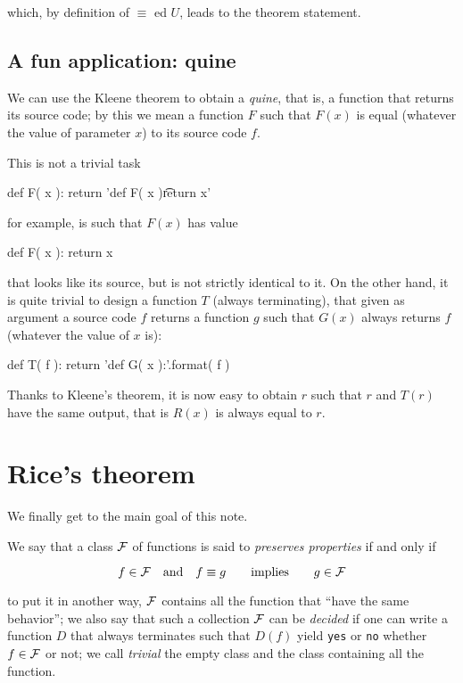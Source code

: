 \documentclass[a4paper]{article}
\begin{document}
which, by definition of $\equiv$ ed $U$, leads to the theorem statement.

\subsection*{A fun application: quine}

We can use the Kleene theorem to obtain a \emph{quine}, that is, a function
that returns its source code; by this we mean a function $F$ such that $F(x)$
is equal (whatever the value of parameter $x$) to its source code $f$.

This is not a trivial task

\begin{pycode}
def F( x ):
  return 'def F( x )\n\t return x'
\end{pycode}

for example, is such that $F(x)$ has value

\begin{pycode}
def F( x ):
  return x
\end{pycode}

that looks like its source, but is not strictly identical to it. On the other
hand, it is quite trivial to design a function $T$ (always terminating), that
given as argument a source code $f$ returns a function $g$ such that $G(x)$
always returns $f$ (whatever the value of $x$ is):

\begin{pycode}
def T( f ):
  return 'def G( x ):\n{}'.format( f )
\end{pycode}

Thanks to Kleene's theorem, it is now easy to obtain $r$ such that $r$ and
$T(r)$ have the same output, that is $R(x)$ is always equal to $r$.


\section*{Rice's theorem}

We finally get to the main goal of this note.

We say that a class $\cal F$ of functions is said to \emph{preserves
properties} if and only if

\[
  f\in{\cal F} \quad\text{and}\quad f\equiv g \qquad\text{implies}\qquad g\in{\cal F}
\]

to put it in another way, $\cal F$ contains all the function that ``have the
same behavior''; we also say that such a collection $\cal F$ can be
\emph{decided} if one can write a function $D$ that always terminates such
that  $D(f)$ yield \verb|yes| or \verb|no| whether $f\in\cal F$ or not; we
call \emph{trivial} the empty class and the class containing all the function.
\end{document}
